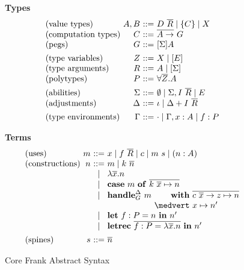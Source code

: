 \documentclass{sigplanconf}
\makeatletter
\newcommand{\fighead}{\textbf}
\newcommand{\many}{\overline}
\newcommand\ba{\begin{array}}
\newcommand\ea{\end{array}}
\newenvironment{syntax}{\[\ba{@{}l@{~}r@{~}c@{~}l@{}}}{\ea\]\ignorespacesafterend}
\newcommand{\sig}{I}
\newcommand{\sigs}{\Sigma}
\newcommand{\effbox}[1]{[#1]}
\newcommand{\key}[1]{\mathbf{#1}} %
\newcommand{\handleSymbol}{\rightarrow}
\newcommand{\handle}[2]{{#1} \handleSymbol {#2}}
\newcommand{\thunk}[1]{\{{#1}\}}
\newcommand\slab[1]{(\textrm{#1})}
\newcommand{\adj}{\Delta}
\newcommand{\ev}{E}
\newcommand{\nowt}{\emptyset}
\newcommand{\id}{\iota}
\makeatother
\begin{document}
\begin{figure}
\fighead{Types}
\begin{syntax}
\slab{value types}       &A, B     &::=& D~\many{R} \mid \thunk{C} \mid X \\
\slab{computation types} &C        &::=& \many{A \to}~G \\
\slab{pegs}              &G             &::=& \effbox{\sigs}A \\
[1ex]
\slab{type variables}    &Z        &::=& X \mid \effbox{\ev} \\
\slab{type arguments}    &R        &::=& A \mid \effbox{\sigs} \\
\slab{polytypes}         &P        &::=& \forall \many{Z}.A \\
[1ex]
\slab{abilities}    &\sigs  &::=&
  \nowt \mid \sigs, \sig~\many{R} \mid \ev \\
\slab{adjustments}  &\adj  &::=&
  \id \mid \adj + \sig~\many{R} \\
[1ex]
\slab{type environments}
                    &\Gamma        &::=& \cdot \mid \Gamma, x:A \mid f:P \\
\end{syntax}

\fighead{Terms}
\begin{syntax}
\slab{uses}         &m       &::=& x \mid f~\many{R} \mid c \mid m~s \mid (n : A) \\
\slab{constructions}&n       &::=& m \mid k~\many{n} \\
   &&\mid& \lambda \many{x}.n \\
   &&\mid& \key{case}~m~\key{of}~
             \many{k~\many{x} \mapsto n} \\
   &&\mid& \key{handle}^\adj_G~m~
             \ba[t]{@{}r@{}l@{}}
             \key{with}~& \many{\handle{c~\many{x}}{z} \mapsto n} \\
             \medvert~  &  x \mapsto n' \\
             \ea \\
   &&\mid&  \key{let}~f : P = n~\key{in}~n' \\
   &&\mid&  \key{letrec}~\many{f : P = \lambda \many{x}.n}~\key{in}~n' \\
[1ex]
\slab{spines}&s           &::=& \many{n} \\
\end{syntax}
\caption{Core Frank Abstract Syntax}
\label{fig:core-syntax}
\end{figure}
\end{document}
